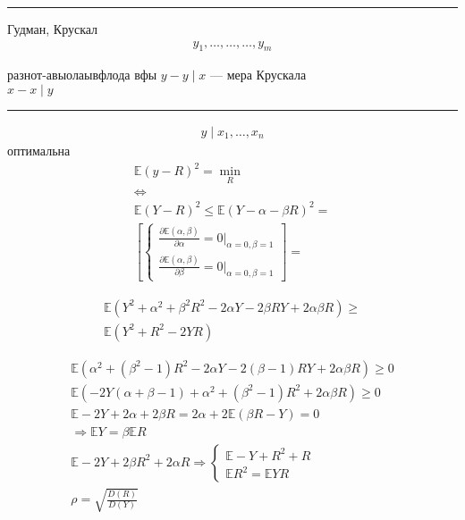 \documentclass{book}
\begin{document}
\hrule
Гудман, Крускал\\

\begin{gather*}
  y_1,\dots,\dots,\dots,y_m
\end{gather*}

разнот-авыолаывфлода вфы $y-y\mid x$ --- мера Крускала\\
$x-x\mid y$ \\

\hrule

\begin{gather*}
  y\mid x_1, \dots, x_n
\end{gather*}
оптимальна
\begin{gather*}
    \mathbb{E}(y-R)^2=\min_R\\
    \Leftrightarrow\\
    \mathbb{E}(Y-R)^2\leq \mathbb{E}(Y-\alpha-\beta R)^2=\\
    \left[\begin{cases}
            \frac{\partial \mathbb{E}(\alpha, \beta)}{\partial \alpha}=0\Big|_{\alpha=0,\beta=1}\\
            \frac{\partial \mathbb{E}(\alpha, \beta)}{\partial \beta}=0\Big|_{\alpha=0,\beta=1}
    \end{cases}\right]=
\end{gather*}

\begin{gather*}
  \mathbb{E}(Y^2+\alpha^2+\beta^2 R^2-2\alpha Y - 2\beta RY+2\alpha\beta R)\geq\\
  \mathbb{E}(Y^2+R^2-2YR)
\end{gather*}

\begin{gather*}
  \mathbb{E}(\alpha^2+(\beta^2-1)R^2-2\alpha Y - 2(\beta-1)RY+2\alpha\beta R) \geq 0\\
  \mathbb{E}(-2Y(\alpha+\beta-1)+\alpha^2+(\beta^2-1)R^2+2\alpha\beta R)\geq 0\\
  \mathbb{E}-2Y+2\alpha+2\beta R = 2\alpha + 2 \mathbb{E}(\beta R - Y) = 0\\
  \Rightarrow \mathbb{E}Y=\beta \mathbb{E}R\\
  \mathbb{E}-2Y+2\beta R^2+2\alpha R \Rightarrow
  \begin{cases}
      \mathbb{E}-Y+R^2+R\\
      \mathbb{E}R^2=\mathbb{E}YR
  \end{cases}\\
  \rho=\sqrt{\frac{D(R)}{D(Y)}}
\end{gather*}
\end{document}
